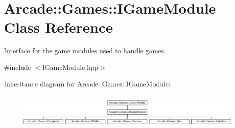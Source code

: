 \hypertarget{classArcade_1_1Games_1_1IGameModule}{}\section{Arcade\+::Games\+::I\+Game\+Module Class Reference}
\label{classArcade_1_1Games_1_1IGameModule}


Interface for the game modules used to handle games.  




{\ttfamily \#include $<$I\+Game\+Module.\+hpp$>$}

Inheritance diagram for Arcade\+::Games\+::I\+Game\+Module\+:\begin{figure}[H]
\begin{center}
\leavevmode
\includegraphics[height=1.723077cm]{classArcade_1_1Games_1_1IGameModule}
\end{center}
\end{figure}
